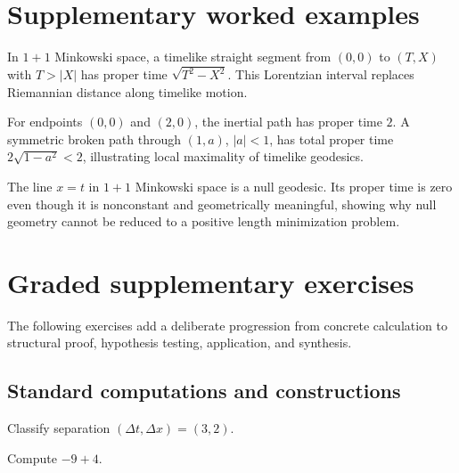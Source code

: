 \section{Supplementary worked examples}
\label{sec:vii30-pedagogy}

\begin{example}\label{ex:vii30-ped-01}
In \(1+1\) Minkowski space, a timelike straight segment from \((0,0)\) to \((T,X)\) with \(T>|X|\) has proper time \(\sqrt{T^2-X^2}\).  This Lorentzian interval replaces Riemannian distance along timelike motion.
\end{example}

\begin{example}\label{ex:vii30-ped-02}
For endpoints \((0,0)\) and \((2,0)\), the inertial path has proper time \(2\).  A symmetric broken path through \((1,a)\), \(|a|<1\), has total proper time \(2\sqrt{1-a^2}<2\), illustrating local maximality of timelike geodesics.
\end{example}

\begin{example}\label{ex:vii30-ped-03}
The line \(x=t\) in \(1+1\) Minkowski space is a null geodesic.  Its proper time is zero even though it is nonconstant and geometrically meaningful, showing why null geometry cannot be reduced to a positive length minimization problem.
\end{example}

\section{Graded supplementary exercises}
The following exercises add a deliberate progression from concrete calculation to structural proof, hypothesis testing, application, and synthesis.

\subsection*{Standard computations and constructions}

\begin{exercise}\label{exr:vii30-ped-01}
Classify separation \((\Delta t,\Delta x)=(3,2)\).
\end{exercise}

\begin{hint}
Compute \(-9+4\).
\end{hint}

